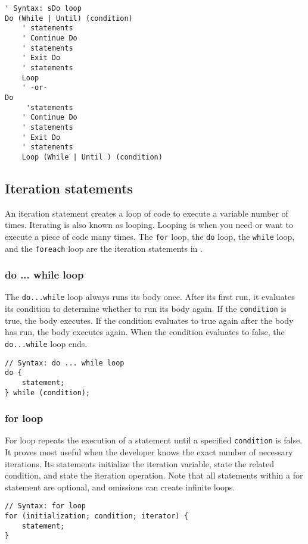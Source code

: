 \begin{lstlisting}[style=vb, numbers = none]
' Syntax: sDo loop	
Do (While | Until) (condition)
	' statements
	' Continue Do
	' statements 
	' Exit Do 
	' statements
	Loop
	' -or-
Do
	 'statements
	' Continue Do
	' statements 
	' Exit Do 
	' statements
	Loop (While | Until ) (condition)
\end{lstlisting}


\subsection{Iteration statements}
An iteration statement creates a loop of code to execute a variable number of times. Iterating is also known as looping. Looping is when you need or want to execute a piece of code many times. The \verb|for| loop, the \verb|do| loop, the \verb|while| loop, and the \verb|foreach| loop are the iteration statements in {\cs}.

\subsubsection{do ... while loop}
The \verb|do...while| loop always runs its body once. After its first run, it evaluates its condition to determine whether to run its body again. If the \verb|condition| is true, the body executes. If the condition evaluates to true again after the body has run, the body executes again. When the condition evaluates to false, the \verb|do...while| loop ends.
\begin{lstlisting}[numbers=none]
// Syntax: do ... while loop
do {
	statement;
} while (condition);
\end{lstlisting}

\subsubsection{for loop}
For loop repeats the execution of a statement until a specified \verb|condition| is false. It proves most useful when the developer knows the exact number of necessary iterations. Its statements initialize the iteration variable, state the related condition, and state the iteration operation. Note that all statements within a for statement are optional, and omissions can create infinite loops.

\begin{lstlisting}[numbers=none]
// Syntax: for loop
for (initialization; condition; iterator) {
	statement;
}
\end{lstlisting}

